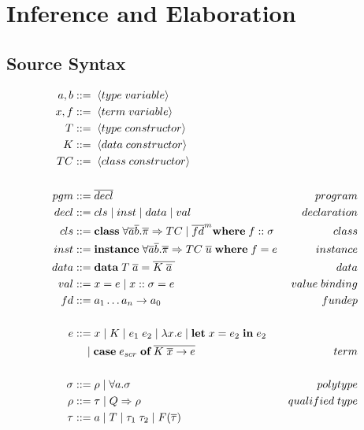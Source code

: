 \section{Inference and Elaboration}

\subsection{Source Syntax}
\begin{figure}[h]
\begin{align*}
    a, b &::= \; \langle type \; variable \rangle \\
    x, f &::= \; \langle term \; variable \rangle \\
    T    &::= \; \langle type \; constructor \rangle \\
    K    &::= \; \langle data \; constructor \rangle \\
    TC   &::= \; \langle class \; constructor \rangle \\
    \\
    pgm &::= \overline{decl} &program\\
    decl &::= cls \mid inst \mid data \mid val &declaration\\
    cls &::= \textbf{class} \; \forall \overline{a} \overline{b}. \overline{\pi}
    \Rightarrow TC \mid \overline{fd}^m \textbf{where} \; f :: \sigma &class\\
    inst &::= \textbf{instance} \; \forall \overline{a} \overline{b}.
    \overline{\pi} \Rightarrow TC \; \overline{u} \; \textbf{where} \; f = e
    &instance\\
    data &::= \textbf{data} \; T \; \overline{a} = \overline{K \; \overline{a}
    \;} &data\\
    val &::= x = e \mid x :: \sigma = e &value \; binding\\
    fd &::= a_1 \mathellipsis a_n \rightarrow a_0 &fundep\\
    \\
    e &::= x \mid K \mid e_1 \; e_2 \mid \lambda x. e \mid \textbf{let} \; x =
    e_2 \; \textbf{in} \; e_2 \\
    &\quad \mid \textbf{case} \; e_{scr} \; \textbf{of} \; \overline{K \; \overline{x}
    \rightarrow e} &term \\
    \\
    \sigma &::= \rho \mid \forall a. \sigma &polytype \\
    \rho &::= \tau \mid Q \Rightarrow \rho &qualified \; type \\
    \tau &::= a \mid T \mid \tau_1 \; \tau_2 \mid F(\overline{\tau})

\end{align*}
\end{figure}
